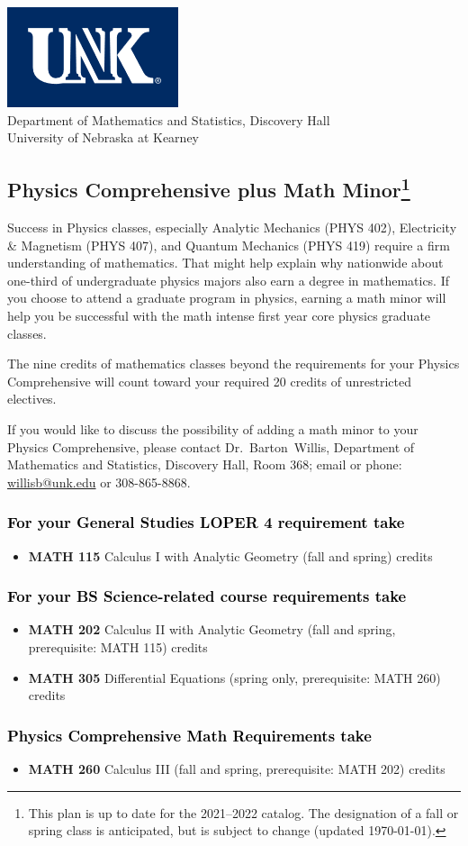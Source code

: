 \documentclass[10pt]{article}
\makeatletter
\newcommand{\calcone}{\textbf{MATH 115} Calculus I with Analytic Geometry (fall and spring) \dotfill 5 credits}
\newcommand{\calctwo}{\textbf{MATH 202} Calculus II with Analytic Geometry (fall and spring, prerequisite: MATH 115) \dotfill 5 credits }
\newcommand{\calcthree}{\textbf{MATH 260} Calculus III  (fall and spring, prerequisite: MATH 202) \dotfill 5 credits}
\newcommand{\diffeq}{\textbf{MATH 305}	Differential Equations (spring only, prerequisite: MATH 260) \dotfill 	3 credits}
\newcommand{\contactbw}{\mbox{Dr.\ Barton Willis}, Department of Mathematics and Statistics,  Discovery Hall, Room 368;
email or phone: \href{mailto:willisb@unk.edu}{willisb@unk.edu} or 308-865-8868.}
\newcommand{\forinfo}[2]{If you would like to discuss the possibility of adding a math {#1} to your {#2}, please contact \contactbw}
\newcommand{\catalog}{2021--2022 }
\newcommand{\myfootnote}{\footnote{This plan is up to date for  the \catalog catalog. The designation of a fall or spring class is 
anticipated, but  is subject to change (updated  \today).}}
\newcommand{\myheading}{
\begin{flushleft}
\includegraphics[scale=0.35]{unk-logo}\\
\setcounter{footnote}{0}
\vspace{0.25in}
 \textcolor{unkblue}{Department of Mathematics and Statistics, Discovery Hall} \\
  \textcolor{unkblue}{University of Nebraska at Kearney}
\end{flushleft}}
\makeatother
\begin{document}
\newpage

\myheading


\subsection*{\textbf{\textcolor{unkblue}{Physics Comprehensive plus Math Minor\myfootnote}}}

\noindent Success in Physics classes, especially  Analytic Mechanics (PHYS 402), Electricity \& Magnetism (PHYS 407), and Quantum Mechanics (PHYS 419) require a firm understanding of mathematics. That might help explain why nationwide about one-third of undergraduate physics majors also earn a degree in mathematics. If you choose to attend a graduate program in physics, earning a math minor will help you be successful with the math intense first year core physics graduate classes.

The nine credits of mathematics classes beyond the requirements for your Physics Comprehensive will count toward your required 20 credits of unrestricted electives.


\forinfo{minor}{Physics Comprehensive}

\subsubsection*{\textcolor{black}{For your General Studies LOPER 4 requirement take}}
\begin{itemize}
\item \calcone
\end{itemize}

\subsubsection*{\textcolor{black}{For your BS Science-related course requirements take}}
\begin{itemize}
\item \calctwo
\item \diffeq
\end{itemize}


\subsubsection*{\textcolor{black}{Physics Comprehensive Math Requirements take}}
\begin{itemize}
 \item \calcthree
\end{itemize}
\end{document}
